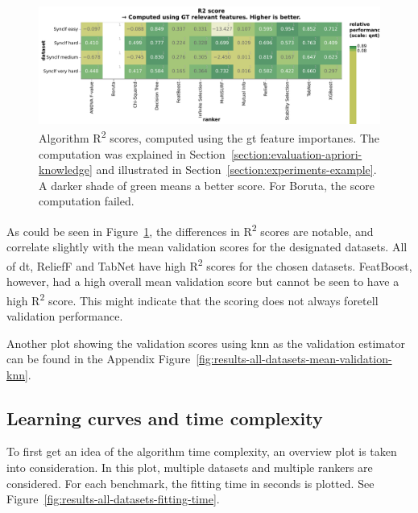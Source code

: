 \documentclass[../main.tex]{subfiles}
\begin{document}
\begin{figure}[ht]
    \centering
    \includegraphics[width=\linewidth]{report/images/results-all-datasets-r2-scores.pdf}
    \caption{Algorithm R\textsuperscript{2} scores, computed using the \gls{gt} feature importanes. The computation was explained in Section~\ref{section:evaluation-apriori-knowledge} and illustrated in Section~\ref{section:experiments-example}. A darker shade of green means a better score. For Boruta, the score computation failed.}
    \label{fig:results-all-datasets-r2-scores}
\end{figure}

As could be seen in Figure~\ref{fig:results-all-datasets-r2-scores}, the differences in R\textsuperscript{2} scores are notable, and correlate slightly with the mean validation scores for the designated datasets. All of \gls{dt}, ReliefF and TabNet have high R\textsuperscript{2} scores for the chosen datasets. FeatBoost, however, had a high overall mean validation score but cannot be seen to have a high R\textsuperscript{2} score. This might indicate that the scoring does not always foretell validation performance.

Another plot showing the validation scores using \gls{knn} as the validation estimator can be found in the Appendix Figure~\ref{fig:results-all-datasets-mean-validation-knn}.


\subsection{Learning curves and time complexity}
To first get an idea of the algorithm time complexity, an overview plot is taken into consideration. In this plot, multiple datasets and multiple rankers are considered. For each benchmark, the fitting time in seconds is plotted. See Figure~\ref{fig:results-all-datasets-fitting-time}.
\end{document}
